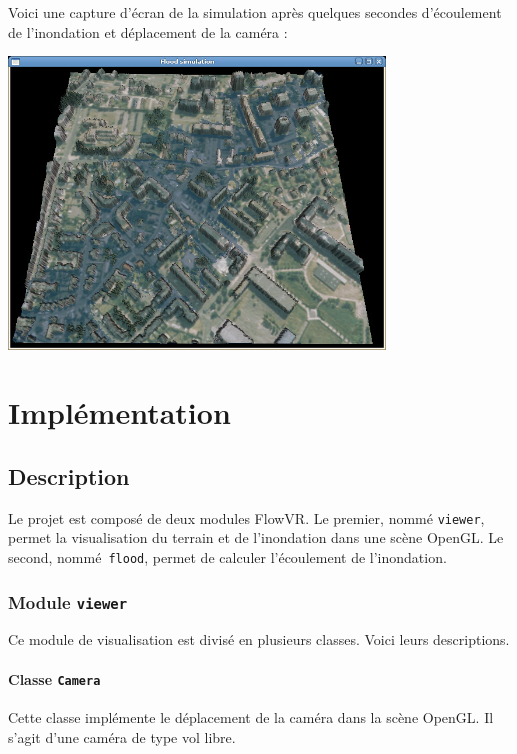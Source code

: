 \documentclass[a4paper, 12pt]{article}
\begin{document}
\pagebreak

Voici une capture d'écran de la simulation après quelques secondes d'écoulement
de l'inondation et déplacement de la caméra :

\begin{center}
\includegraphics[width=0.75\textwidth]{include/captures/2.jpg}
\end{center}

\section{Implémentation}

\subsection{Description}

Le projet est composé de deux modules FlowVR. Le premier, nommé \texttt{viewer},
permet la visualisation du terrain et de l'inondation dans une scène OpenGL. Le
second, nommé \texttt{flood}, permet de calculer l'écoulement de l'inondation.

\subsubsection{Module \texttt{viewer}}

Ce module de visualisation est divisé en plusieurs classes. Voici leurs
descriptions.

\paragraph{Classe \texttt{Camera}}

Cette classe implémente le déplacement de la caméra dans la scène OpenGL. Il
s'agit d'une caméra de type vol libre.
\end{document}
